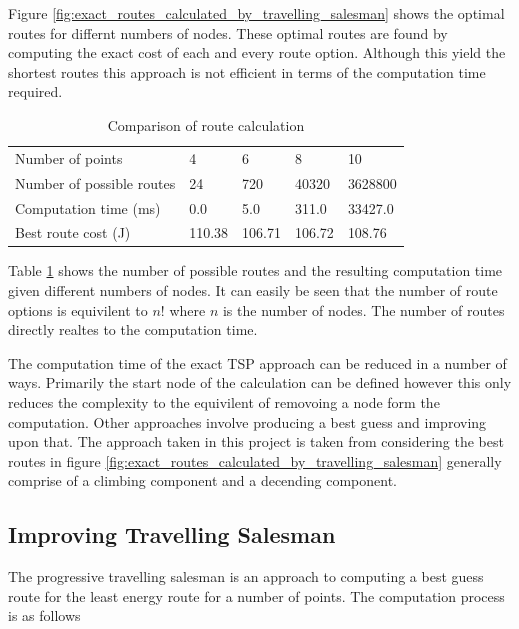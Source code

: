 \documentclass[a4paper,12pt,twoside]{article}
\begin{document}
Figure \ref{fig:exact_routes_calculated_by_travelling_salesman} shows the optimal routes for differnt numbers of nodes. These optimal routes are found by computing the exact cost of each and every route option. Although this yield the shortest routes this approach is not efficient in terms of the computation time required.

\begin{table}[width=\textwidth]
\centering
    \begin{tabular}{lllll}
    Number of points	& 4	& 6	& 8	& 10	\\
Number of possible routes	& 24	& 720	& 40320	& 3628800	\\
Computation time (ms)	& 0.0	& 5.0	& 311.0	& 33427.0	\\
Best route cost (J)	& 110.38	& 106.71	& 106.72	& 108.76	\\

    \end{tabular}
\caption{Comparison of route calculation}
\label{tbl:comparison_of_route_calculation}
\end{table}

Table \ref{tbl:comparison_of_route_calculation} shows the number of possible routes and the resulting computation time given different numbers of nodes. It can easily be seen that the number of route options is equivilent to $n!$ where $n$ is the number of nodes. The number of routes directly realtes to the computation time.

The computation time of the exact TSP approach can be reduced in a number of ways. Primarily the start node of the calculation can be defined however this only reduces the complexity to the equivilent of removoing a node form the computation. Other approaches involve producing a best guess and improving upon that. The approach taken in this project is taken from considering the best routes in figure \ref{fig:exact_routes_calculated_by_travelling_salesman} generally comprise of a climbing component and a decending component.

\subsection{Improving Travelling Salesman}
\label{sec:improving_travelling_salesman}

The progressive travelling salesman is an approach to computing a best guess route for the least energy route for a number of points. The computation process is as follows
\end{document}
